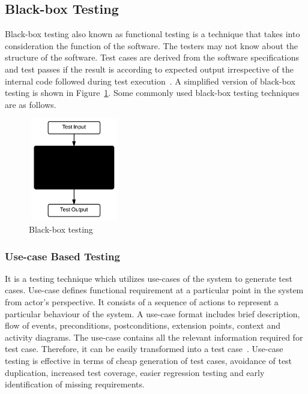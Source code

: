 \subsection{Black-box Testing}
Black-box testing also known as functional testing is a technique that takes into consideration the function of the software. The testers may not know about the structure of the software. Test cases are derived from the software specifications and test passes if the result is according to expected output irrespective of the internal code followed during test execution~\cite{beizer1995black}. A simplified version of black-box testing is shown in Figure~\ref{fig:blackBox}. Some commonly used black-box testing techniques are as follows.

\bigskip
\begin{figure}[h]
\begin{center}
	\includegraphics[width=4cm, height=4.5cm ]{chapter2/blackBox.png}
	\bigskip
	\caption{Black-box testing}
 	\label{fig:blackBox}
\end{center}  
\end{figure}
\bigskip



\subsubsection{Use-case Based Testing}
It is a testing technique which utilizes use-cases of the system to generate test cases. Use-case defines functional requirement at a particular point in the system from actor's perspective. It consists of a sequence of actions to represent a particular behaviour of the system. A use-case format includes brief description, flow of events, preconditions, postconditions, extension points, context and activity diagrams. The use-case contains all the relevant information required for test case. Therefore, it can be easily transformed into a test case~\cite{armour2000advanced}. Use-case testing is effective in terms of cheap generation of test cases, avoidance of test duplication, increased test coverage, easier regression testing and early identification of missing requirements.  

